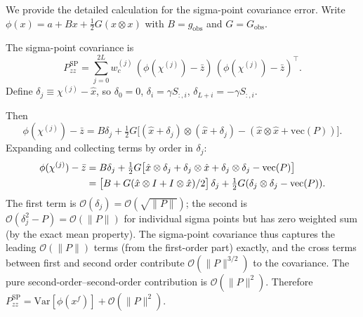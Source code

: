 \documentclass[12pt,a4paper]{article}
\newcommand{\Var}{\mathrm{Var}}
\newcommand{\vect}{\mathrm{vec}}
\newcommand{\kron}{\otimes}
\newcommand{\xf}{{x^{f}}}
\newcommand{\cO}{\mathcal{O}}
\begin{document}
We provide the detailed calculation for the sigma-point covariance
error. Write
$\phi(x) = a + Bx + \tfrac{1}{2}G(x \kron x)$
with $B = g_{\mathrm{obs}}$ and $G = G_{\mathrm{obs}}$.

The sigma-point covariance is
\begin{equation}
P_{zz}^{\mathrm{SP}} = \sum_{j=0}^{2L} w_c^{(j)}\,
  (\phi(\chi^{(j)}) - \bar{z})\,(\phi(\chi^{(j)}) - \bar{z})^\top.
\end{equation}
Define $\delta_j \equiv \chi^{(j)} - \hat{x}$, so
$\delta_0 = 0$, $\delta_i = \gamma S_{:,i}$,
$\delta_{L+i} = -\gamma S_{:,i}$.

Then
\begin{equation}
\phi(\chi^{(j)}) - \bar{z}
= B\delta_j
+ \tfrac{1}{2}G\bigl[
  (\hat{x} + \delta_j) \kron (\hat{x} + \delta_j)
  - (\hat{x} \kron \hat{x} + \vect(P))
\bigr].
\end{equation}
Expanding and collecting terms by order in $\delta_j$:
\begin{align}
\phi(\chi^{(j)}) - \bar{z}
&= B\delta_j
+ \tfrac{1}{2}G\bigl[
  \hat{x} \kron \delta_j + \delta_j \kron \hat{x}
  + \delta_j \kron \delta_j - \vect(P)
\bigr] \notag \\
&= \bigl[B + G(\hat{x} \kron I + I \kron \hat{x})/2\bigr]\,\delta_j
+ \tfrac{1}{2}G(\delta_j \kron \delta_j - \vect(P)).
\end{align}
The first term is $\cO(\delta_j) = \cO(\sqrt{\|P\|})$; the second
is $\cO(\delta_j^2 - P) = \cO(\|P\|)$ for individual sigma points
but has zero weighted sum (by the exact mean property). The
sigma-point covariance thus captures the leading $\cO(\|P\|)$ terms
(from the first-order part) exactly, and the cross terms between
first and second order contribute $\cO(\|P\|^{3/2})$ to the
covariance. The pure second-order--second-order contribution is
$\cO(\|P\|^2)$. Therefore
$P_{zz}^{\mathrm{SP}} = \Var[\phi(\xf)] + \cO(\|P\|^2)$.
\end{document}
